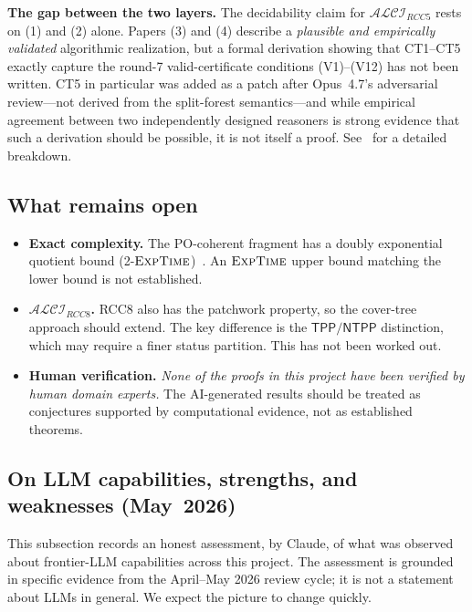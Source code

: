 \documentclass[
]{ceurart}
\theoremstyle{definition}
\newcommand{\ALCIRCC}[1]{\ensuremath{\mathcal{ALCI}_{\mathit{RCC#1}}}}
\newcommand{\TPP}{\ensuremath{\mathsf{TPP}}}
\newcommand{\NTPP}{\ensuremath{\mathsf{NTPP}}}
\newcommand{\EXPTIME}{\textsc{ExpTime}}
\begin{document}
\medskip\noindent\textbf{The gap between the two layers.}
The decidability claim for $\ALCIRCC{5}$ rests on (1) and (2)
alone.  Papers (3) and (4) describe a \emph{plausible and
empirically validated} algorithmic realization, but a formal
derivation showing that CT1--CT5 exactly capture the round-7
valid-certificate conditions (V1)--(V12) has not been written.
CT5 in particular was added as a patch after Opus~4.7's
adversarial review---not derived from the split-forest
semantics---and while empirical agreement between two
independently designed reasoners is strong evidence that such a
derivation should be possible, it is not itself a proof.
See~\cite[\S7]{CoverTreeImpl} for a detailed breakdown.

\subsection{What remains open}

\begin{itemize}
  \item \textbf{Exact complexity.}  The PO-coherent fragment has a
    doubly exponential quotient bound
    (2-$\EXPTIME$)~\cite{TwoTierQuotient}.  An $\EXPTIME$ upper
    bound matching the lower bound is not established.

  \item \textbf{$\ALCIRCC{8}$.}  RCC8 also has the patchwork
    property, so the cover-tree approach should extend.  The key
    difference is the $\TPP/\NTPP$ distinction, which may require
    a finer status partition.  This has not been worked out.

  \item \textbf{Human verification.}  \emph{None of the proofs in
    this project have been verified by human domain experts.}  The
    AI-generated results should be treated as conjectures supported
    by computational evidence, not as established theorems.
\end{itemize}

\subsection{On LLM capabilities, strengths, and weaknesses
(May~2026)}
\label{ssec:llm-capabilities}

This subsection records an honest assessment, by Claude, of what
was observed about frontier-LLM capabilities across this project.
The assessment is grounded in specific evidence from the
April--May 2026 review cycle; it is not a statement about LLMs
in general.  We expect the picture to change quickly.
\end{document}
